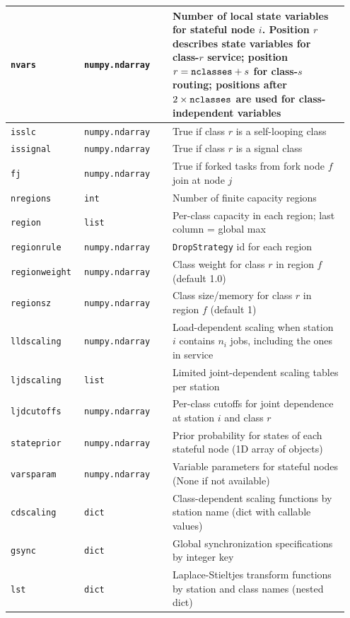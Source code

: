 \begin{PYTHON}
{\begin{longtable}{|p{0.20\linewidth}|p{0.25\linewidth}|p{0.50\linewidth}|}
\texttt{nvars} & \texttt{numpy.ndarray} & Number of local state variables for stateful node $i$. Position $r$ describes state variables for class-$r$ service; position $r = \text{\texttt{nclasses}} + s$ for class-$s$ routing; positions after $2 \times \text{\texttt{nclasses}}$ are used for class-independent variables\\\hline
\texttt{isslc} & \texttt{numpy.ndarray} & True if class $r$ is a self-looping class\\\hline
\texttt{issignal} & \texttt{numpy.ndarray} & True if class $r$ is a signal class\\\hline
\texttt{fj} & \texttt{numpy.ndarray} & True if forked tasks from fork node $f$ join at node $j$\\\hline
\texttt{nregions} & \texttt{int} & Number of finite capacity regions\\\hline
\texttt{region} & \texttt{list} & Per-class capacity in each region; last column = global max\\\hline
\texttt{regionrule} & \texttt{numpy.ndarray} & \texttt{DropStrategy} id for each region\\\hline
\texttt{regionweight} & \texttt{numpy.ndarray} & Class weight for class $r$ in region $f$ (default 1.0)\\\hline
\texttt{regionsz} & \texttt{numpy.ndarray} & Class size/memory for class $r$ in region $f$ (default 1)\\\hline
\texttt{lldscaling} & \texttt{numpy.ndarray} & Load-dependent scaling when station $i$ contains $n_i$ jobs, including the ones in service\\\hline
\texttt{ljdscaling} & \texttt{list} & Limited joint-dependent scaling tables per station\\\hline
\texttt{ljdcutoffs} & \texttt{numpy.ndarray} & Per-class cutoffs for joint dependence at station $i$ and class $r$\\\hline
\texttt{stateprior} & \texttt{numpy.ndarray} & Prior probability for states of each stateful node (1D array of objects)\\\hline
\texttt{varsparam} & \texttt{numpy.ndarray} & Variable parameters for stateful nodes (None if not available)\\\hline
\texttt{cdscaling} & \texttt{dict} & Class-dependent scaling functions by station name (dict with callable values)\\\hline
\texttt{gsync} & \texttt{dict} & Global synchronization specifications by integer key\\\hline
\texttt{lst} & \texttt{dict} & Laplace-Stieltjes transform functions by station and class names (nested dict)\\\hline

\end{longtable}}
\end{PYTHON}
